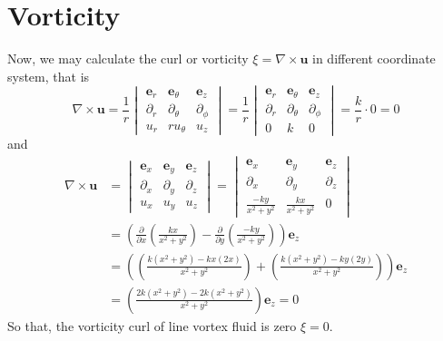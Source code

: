 \documentclass[12pt]{article}
\begin{document}
\section{Vorticity}
Now, we may calculate the curl or vorticity $\xi = \nabla\times\textbf{u}$ in different coordinate system, that is
\begin{equation}
\nabla \times \textbf{u} 
= \frac{1}{r}\begin{vmatrix}
\textbf{e}_r & \textbf{e}_\theta & \textbf{e}_z \\
\partial_r & \partial_\theta & \partial_\phi \\ 
u_r & ru_\theta & u_z
\end{vmatrix}
= \frac{1}{r}\begin{vmatrix}
\textbf{e}_r & \textbf{e}_\theta & \textbf{e}_z \\
\partial_r & \partial_\theta & \partial_\phi \\ 
0 & k & 0
\end{vmatrix} = \frac{k}{r}\cdot 0 = 0
\end{equation}
and 
\begin{align}
\nabla \times \textbf{u} 
& = \begin{vmatrix}
\textbf{e}_x & \textbf{e}_y & \textbf{e}_z \\
\partial_x & \partial_y & \partial_z \\ 
u_x & u_y & u_z
\end{vmatrix}
= \begin{vmatrix}
\textbf{e}_x & \textbf{e}_y & \textbf{e}_z \\
\partial_x & \partial_y & \partial_z \\[6pt]
\displaystyle \frac{-ky}{x^2+y^2} & \displaystyle \frac{kx}{x^2+y^2} & 0
\end{vmatrix}\\
&= \left(\frac{\partial}{\partial x}\left(\frac{kx}{x^2+y^2}\right) - \frac{\partial}{\partial y}\left(\frac{-ky}{x^2+y^2}\right)\right) \textbf{e}_z\\
&= \left(\left(\frac{k\left(x^2+y^2\right) - kx \left(2x\right)}{x^2+y^2}\right) 
	+ \left(\frac{k\left(x^2+y^2\right) - ky\left(2y\right)}{x^2+y^2}\right)\right) \textbf{e}_z\\
&= \left(\frac{2k\left(x^2+y^2\right) - 2k\left(x^2 + y^2\right)}{x^2+y^2}\right)  \textbf{e}_z = 0
\end{align}
So that, the vorticity curl of line vortex fluid is zero $\xi = 0$.
\end{document}
